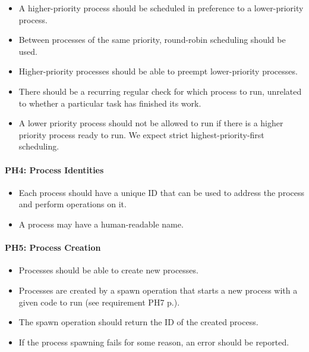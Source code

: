 \begin{itemize}
  \item  A higher-priority process should be scheduled in preference to a lower-priority process.
  \item  Between processes of the same priority, round-robin scheduling should be used.
  \item  Higher-priority processes should be able to preempt lower-priority processes.
  \item  There should be a recurring regular check for which process to run, unrelated to whether a particular task has finished its work.
  \item  A lower priority process should not be allowed to run if there is a higher priority process ready to run. We expect strict highest-priority-first scheduling.
\end{itemize}

\paragraph*{PH4: Process Identities}
\label{pg:ph4}

\begin{itemize}
  \item Each process should have a unique ID that can be used to address the process and perform operations on it.
  \item  A process may have a human-readable name.
\end{itemize}

\paragraph*{PH5: Process Creation}
\label{pg:ph5}

\begin{itemize}
  \item Processes should be able to create new processes.
  \item  Processes are created by a spawn operation that starts a new process with a given code to run (see requirement PH7 p.\pageref{pg:ph7}).
  \item  The spawn operation should return the ID of the created process.
  \item  If the process spawning fails for some reason, an error should be reported.
\end{itemize}

